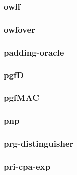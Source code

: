\begin{frame}\frametitle{owff}
\begin{figure}
\begin{center}

\end{center}
\end{figure}
\end{frame}
\begin{frame}\frametitle{owfover}
\begin{figure}
\begin{center}

\end{center}
\end{figure}
\end{frame}
\begin{frame}\frametitle{padding-oracle}
\begin{figure}
\begin{center}

\end{center}
\end{figure}
\end{frame}
\begin{frame}\frametitle{pgfD}
\begin{figure}
\begin{center}

\end{center}
\end{figure}
\end{frame}
\begin{frame}\frametitle{pgfMAC}
\begin{figure}
\begin{center}

\end{center}
\end{figure}
\end{frame}
\begin{frame}\frametitle{pnp}
\begin{figure}
\begin{center}

\end{center}
\end{figure}
\end{frame}
\begin{frame}\frametitle{prg-distinguisher}
\begin{figure}
\begin{center}

\end{center}
\end{figure}
\end{frame}
\begin{frame}\frametitle{pri-cpa-exp}
\begin{figure}
\begin{center}

\end{center}
\end{figure}
\end{frame}
